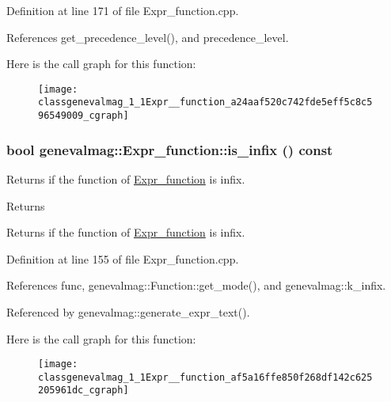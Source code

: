 Definition at line 171 of file Expr\_\-function.cpp.



References get\_\-precedence\_\-level(), and precedence\_\-level.



Here is the call graph for this function:\nopagebreak
\begin{figure}[H]
\begin{center}
\leavevmode
\texttt{[image: classgenevalmag\_1\_1Expr\_\_function\_a24aaf520c742fde5eff5c8c596549009\_cgraph]}
\end{center}
\end{figure}


\hypertarget{classgenevalmag_1_1Expr__function_af5a16ffe850f268df142c625205961dc}{
\subsubsection[{is\_\-infix}]{\setlength{\rightskip}{0pt plus 5cm}bool genevalmag::Expr\_\-function::is\_\-infix () const}}
\label{classgenevalmag_1_1Expr__function_af5a16ffe850f268df142c625205961dc}
Returns if the function of \hyperlink{classgenevalmag_1_1Expr__function}{Expr\_\-function} is infix. \begin{DoxyReturn}{Returns}

\end{DoxyReturn}
Returns if the function of \hyperlink{classgenevalmag_1_1Expr__function}{Expr\_\-function} is infix. 

Definition at line 155 of file Expr\_\-function.cpp.



References func, genevalmag::Function::get\_\-mode(), and genevalmag::k\_\-infix.



Referenced by genevalmag::generate\_\-expr\_\-text().



Here is the call graph for this function:\nopagebreak
\begin{figure}[H]
\begin{center}
\leavevmode
\texttt{[image: classgenevalmag\_1\_1Expr\_\_function\_af5a16ffe850f268df142c625205961dc\_cgraph]}
\end{center}
\end{figure}




